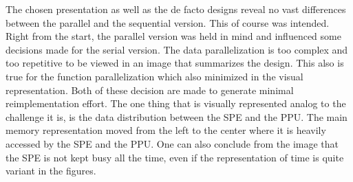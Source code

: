 The chosen presentation as well as the de facto designs reveal no vast differences between the parallel and the sequential version. This of course was intended. Right from the start, the parallel version was held in mind and influenced some decisions made for the serial version. The data parallelization is too complex and too repetitive to be viewed in an image that summarizes the design. This also is true for the function parallelization which also minimized in the visual representation. Both of these decision are made to generate minimal reimplementation effort. The one thing that is visually represented analog to the challenge it is, is the data distribution between the SPE and the PPU. The main memory representation moved from the left to the center where it is heavily accessed by the SPE and the PPU. One can also conclude from the image that the SPE is not kept busy all the time, even if the representation of time is quite variant in the figures.





